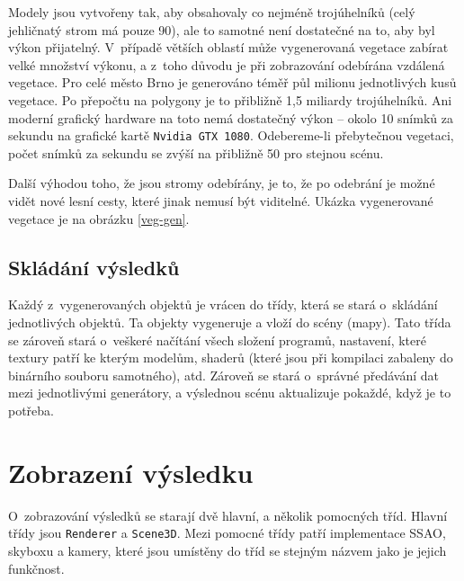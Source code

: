 Modely jsou vytvořeny tak, aby obsahovaly co nejméně trojúhelníků (celý jehličnatý strom má pouze 90), ale to samotné není dostatečné na to, aby byl výkon přijatelný. V~případě větších oblastí může vygenerovaná vegetace zabírat velké množství výkonu, a z~toho důvodu je při zobrazování odebírána vzdálená vegetace. Pro celé město Brno je generováno téměř půl milionu jednotlivých kusů vegetace. Po přepočtu na polygony je to přibližně 1,5 miliardy trojúhelníků. Ani moderní grafický hardware na toto nemá dostatečný výkon -- okolo 10 snímků za sekundu na grafické kartě \verb|Nvidia GTX 1080|. Odebereme-li přebytečnou vegetaci, počet snímků za sekundu se zvýší na přibližně 50 pro stejnou scénu.

Další výhodou toho, že jsou stromy odebírány, je to, že po odebrání je možné vidět nové lesní cesty, které jinak nemusí být viditelné. Ukázka vygenerované vegetace je na obrázku \ref{veg-gen}.

\subsection*{Skládání výsledků}
Každý z~vygenerovaných objektů je vrácen do třídy, která se stará o~skládání jednotlivých objektů. Ta objekty vygeneruje a vloží do scény (mapy). Tato třída se zároveň stará o~veškeré načítání všech složení programů, nastavení, které textury patří ke kterým modelům, shaderů (které jsou při kompilaci zabaleny do binárního souboru samotného), atd. Zároveň se stará o~správné předávání dat mezi jednotlivými generátory, a výslednou scénu aktualizuje pokaždé, když je to potřeba.

\section{Zobrazení výsledku} \label{render-out}
O~zobrazování výsledků se starají dvě hlavní, a několik pomocných tříd. Hlavní třídy jsou \verb|Renderer| a \verb|Scene3D|. Mezi pomocné třídy patří implementace SSAO, skyboxu a kamery, které jsou umístěny do tříd se stejným názvem jako je jejich funkčnost.

